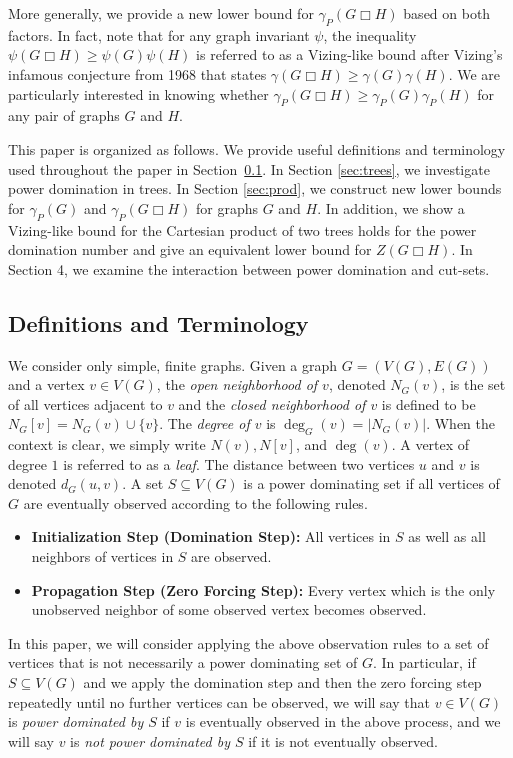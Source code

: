 \documentclass[11pt]{article}
\begin{document}
More generally, we provide a new lower bound for $\gamma_P(G \Box H)$ based on both factors. In fact, note that for any graph invariant $\psi$, the inequality $\psi(G\Box H) \ge \psi(G)\psi(H)$ is referred to as a Vizing-like bound after Vizing's infamous conjecture \cite{Vizing} from 1968 that states $\gamma(G\Box H) \ge \gamma(G)\gamma(H)$. We are particularly interested in knowing whether $\gamma_P(G\Box H) \ge\gamma_P(G)\gamma_P(H)$ for any pair of graphs $G$ and $H$.  

This paper is organized as follows. We provide useful definitions and terminology used throughout the paper in Section~\ref{sec:defn}. In Section \ref{sec:trees}, we investigate power domination in trees. In Section \ref{sec:prod}, we construct new lower bounds for $\gamma_P(G)$ and $\gamma_P(G \Box H)$ for graphs $G$ and $H$. In addition, we show a Vizing-like bound for the Cartesian product of two trees holds for the power domination number and give an equivalent lower bound for $Z(G\Box H)$. In Section 4, we examine the interaction between power domination and cut-sets. 

\subsection{Definitions and Terminology}\label{sec:defn}
We consider only simple, finite graphs. Given a graph $G = (V(G), E(G))$ and a vertex $v \in V(G)$, the {\it open neighborhood of $v$}, denoted $N_G(v)$, is the set of all vertices adjacent to $v$ and the {\it closed neighborhood of $v$} is defined to be $N_G[v] = N_G(v) \cup \{v\}$. The {\it degree of $v$} is $\deg_G(v) = |N_G(v)|$. When the context is clear, we simply write $N(v), N[v]$, and $\deg(v)$. A vertex of degree $1$ is referred to as a {\it leaf}. The distance between two vertices $u$ and $v$ is denoted $d_G(u,v)$.  A set $S\subseteq V(G)$ is a power dominating set if all vertices of $G$ are eventually observed according to the following rules. 
\begin{itemize}
\item \textbf{Initialization Step (Domination Step):} All vertices in $S$ as well as all neighbors of vertices in $S$ are observed.
\item \textbf{Propagation Step (Zero Forcing Step):} Every vertex which is the only unobserved neighbor of some observed vertex becomes observed.
\end{itemize}
In this paper, we will consider applying the above observation rules to a set of vertices that is not necessarily a power dominating set of $G$. In particular, if $S\subseteq V(G)$ and we apply the domination step and then the zero forcing step repeatedly until no further vertices can be observed, we will say that $v \in V(G)$ is {\it power dominated by $S$} if $v$ is eventually observed in the above process, and we will say $v$ is {\it not power dominated by $S$} if it is not eventually observed. 
\end{document}
